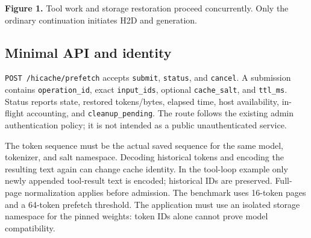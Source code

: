\documentclass[10pt,a4paper]{article}
\newcommand{\code}[1]{\texttt{#1}}
\begin{document}
\begin{center}
\end{center}
{\small\textbf{Figure 1.} Tool work and storage restoration proceed concurrently. Only the ordinary continuation initiates H2D and generation.}

\subsection{Minimal API and identity}
\code{POST /hicache/prefetch} accepts \code{submit}, \code{status}, and \code{cancel}. A submission contains \code{operation\_id}, exact \code{input\_ids}, optional \code{cache\_salt}, and \code{ttl\_ms}. Status reports state, restored tokens/bytes, elapsed time, host availability, in-flight accounting, and \code{cleanup\_pending}. The route follows the existing admin authentication policy; it is not intended as a public unauthenticated service.

The token sequence must be the actual saved sequence for the same model, tokenizer, and salt namespace. Decoding historical tokens and encoding the resulting text again can change cache identity. In the tool-loop example only newly appended tool-result text is encoded; historical IDs are preserved. Full-page normalization applies before admission. The benchmark uses 16-token pages and a 64-token prefetch threshold. The application must use an isolated storage namespace for the pinned weights: token IDs alone cannot prove model compatibility.
\end{document}
